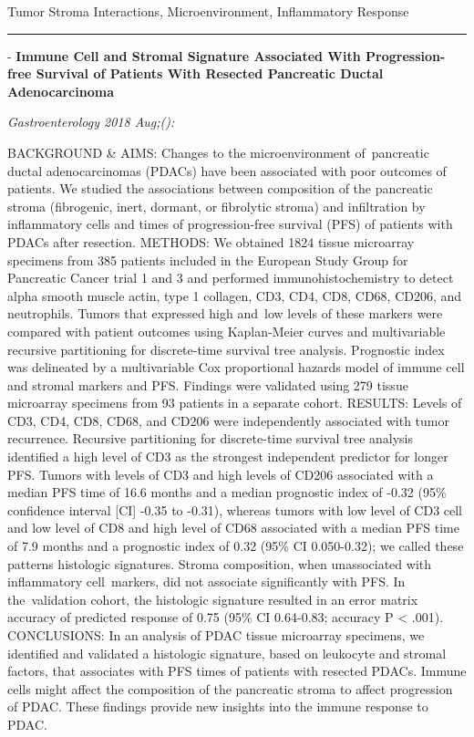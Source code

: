 \documentclass[]{article}
\begin{document}
Tumor Stroma Interactions, Microenvironment, Inflammatory Response

\begin{center}\rule{0.5\linewidth}{\linethickness}\end{center}

 - \textbf{Immune Cell and Stromal Signature Associated With
Progression-free Survival of Patients With Resected Pancreatic Ductal
Adenocarcinoma}

\emph{Gastroenterology 2018 Aug;():}

BACKGROUND \& AIMS: Changes to the microenvironment of~pancreatic ductal
adenocarcinomas (PDACs) have been associated with poor outcomes of
patients. We studied the associations between composition of the
pancreatic stroma (fibrogenic, inert, dormant, or fibrolytic stroma) and
infiltration by inflammatory cells and times of progression-free
survival (PFS) of patients with PDACs after resection. METHODS: We
obtained 1824 tissue microarray specimens from 385 patients included in
the European Study Group for Pancreatic Cancer trial 1 and 3 and
performed immunohistochemistry to detect alpha smooth muscle actin, type
1 collagen, CD3, CD4, CD8, CD68, CD206, and neutrophils. Tumors that
expressed high and~low levels of these markers were compared with
patient outcomes using Kaplan-Meier curves and multivariable recursive
partitioning for discrete-time survival tree analysis. Prognostic index
was delineated by a multivariable Cox proportional hazards model of
immune cell and stromal markers and PFS. Findings were validated using
279 tissue microarray specimens from 93 patients in a separate cohort.
RESULTS: Levels of CD3, CD4, CD8, CD68, and CD206 were independently
associated with tumor recurrence. Recursive partitioning for
discrete-time survival tree analysis identified a high level of CD3 as
the strongest independent predictor for longer PFS. Tumors with levels
of CD3 and high levels of CD206 associated with a median PFS time of
16.6 months and a median prognostic index of -0.32 (95\% confidence
interval {[}CI{]} -0.35 to -0.31), whereas tumors with low level of CD3
cell and low level of CD8 and high level of CD68 associated with a
median PFS time of 7.9 months and a prognostic index of 0.32 (95\% CI
0.050-0.32); we called these patterns histologic signatures. Stroma
composition, when unassociated with inflammatory cell~markers, did not
associate significantly with PFS. In the~validation cohort, the
histologic signature resulted in an error matrix accuracy of predicted
response of 0.75 (95\% CI 0.64-0.83; accuracy P \textless{} .001).
CONCLUSIONS: In an analysis of PDAC tissue microarray specimens, we
identified and validated a histologic signature, based on leukocyte and
stromal factors, that associates with PFS times of patients with
resected PDACs. Immune cells might affect the composition of the
pancreatic stroma to affect progression of PDAC. These findings provide
new insights into the immune response to PDAC.
\end{document}

